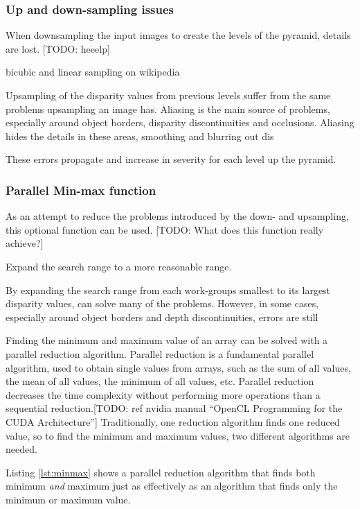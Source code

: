 \subsubsection{Up and down-sampling issues}

When downsampling the input images to create the levels of the
pyramid, details are lost. [TODO: heeelp]

bicubic and linear sampling on wikipedia

Upsampling of the disparity values from previous levels suffer from
the same problems upsampling an image has. Aliasing is the main source
of problems, especially around object borders, disparity
discontinuities and occlusions. Aliasing hides the details in these
areas, smoothing and blurring out dis

These errors propagate and increase in
severity for each level up the pyramid.

\subsubsection{Parallel Min-max function}

As an attempt to reduce the problems introduced by the down- and
upsampling, this optional function can be used. [TODO: What does this
function really achieve?]

Expand the search range to a more reasonable range.

By expanding the search range from each
work-groups smallest to its largest disparity values, can solve many
of the problems. However, in some cases, especially around object
borders and depth discontinuities, errors are still

Finding the minimum and maximum value of an array can be solved with a
parallel reduction algorithm. Parallel reduction is a fundamental
parallel algorithm, used to obtain single values from arrays, such as
the sum of all values, the mean of all values, the minimum of all
values, etc. Parallel reduction decreases the time complexity without
performing more operations than a sequential reduction.[TODO: ref
  nvidia manual ``OpenCL Programming for the CUDA Architecture'']
Traditionally, one reduction algorithm finds one reduced value, so to
find the minimum and maximum values, two different algorithms are
needed.

Listing \ref{lst:minmax} shows a parallel reduction algorithm that
finds both minimum \textit{and} maximum just as effectively as an
algorithm that finds only the minimum or maximum value.


